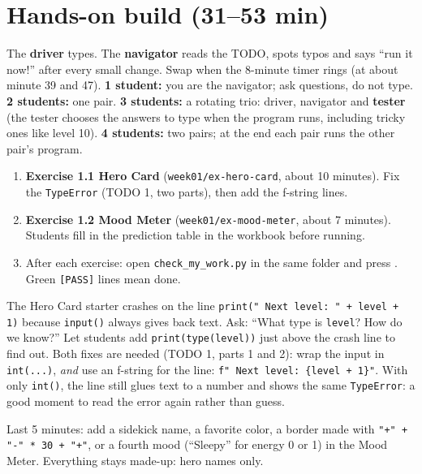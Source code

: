 \section{Hands-on build (31--53 min)}
\begin{pairroles}
The \textbf{driver} types. The \textbf{navigator} reads the TODO, spots typos and says \enquote{run it now!} after every small change.
Swap when the 8-minute timer rings (at about minute 39 and 47).
\textbf{1 student:} you are the navigator; ask questions, do not type.
\textbf{2 students:} one pair. \textbf{3 students:} a rotating trio: driver, navigator and \textbf{tester} (the tester chooses
the answers to type when the program runs, including tricky ones like level 10).
\textbf{4 students:} two pairs; at the end each pair runs the other pair's program.
\end{pairroles}

\begin{enumerate}[leftmargin=1.4em]
  \item \textbf{Exercise 1.1 Hero Card} (\texttt{week01/ex-hero-card}, about 10 minutes). Fix the \texttt{TypeError} (TODO 1, two parts), then add the f-string lines.
  \item \textbf{Exercise 1.2 Mood Meter} (\texttt{week01/ex-mood-meter}, about 7 minutes). Students fill in the prediction table in the workbook before running.
  \item After each exercise: open \texttt{check\_my\_work.py} in the same folder and press . Green \texttt{[PASS]} lines mean done.
\end{enumerate}

\begin{bughunt}[\texttt{"5" + 5}]
The Hero Card starter crashes on the line \texttt{print("  Next level:   " + level + 1)} because \texttt{input()} always gives back text.
Ask: \enquote{What type is \texttt{level}? How do we know?} Let students add \texttt{print(type(level))} just above the crash line to find out.
Both fixes are needed (TODO 1, parts 1 and 2): wrap the input in \texttt{int(...)}, \emph{and} use an f-string for the line: \texttt{f"  Next level:   \{level + 1\}"}.
With only \texttt{int()}, the line still glues text to a number and shows the same \texttt{TypeError}: a good moment to read the error again rather than guess.
\end{bughunt}

\begin{freebuild}
Last 5 minutes: add a sidekick name, a favorite color, a border made with \texttt{"+" + "-" * 30 + "+"}, or a fourth mood
(\enquote{Sleepy} for energy 0 or 1) in the Mood Meter. Everything stays made-up: hero names only.
\end{freebuild}

